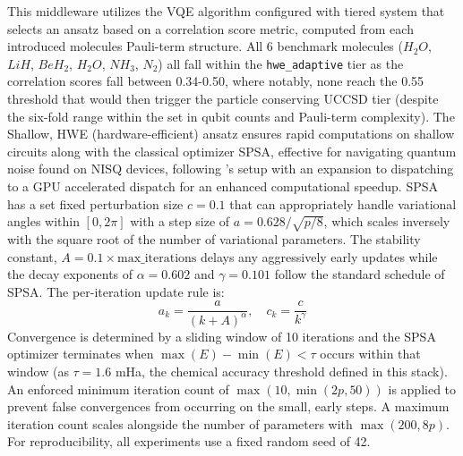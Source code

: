 This middleware utilizes the VQE algorithm configured with tiered system that selects an ansatz based on a correlation score metric, computed
from each introduced molecules Pauli-term structure. All 6 benchmark molecules ($H_{2}O$, $LiH$, $BeH_{2}$, $H_{2}O$, $NH_{3}$, $N_{2}$) all fall within the \texttt{hwe_adaptive}
tier as the correlation scores fall between 0.34-0.50, where notably, none reach the 0.55 threshold that would then trigger the particle conserving UCCSD tier (despite the six-fold range within the set in qubit 
counts and Pauli-term complexity). The Shallow, HWE (hardware-efficient) ansatz ensures rapid computations on shallow circuits along with the classical optimizer SPSA, 
effective for navigating quantum noise found on NISQ devices, following \textcite{kandala2017hardware}'s setup with an expansion to dispatching to a GPU accelerated dispatch for an enhanced computational speedup.  
SPSA has a set fixed perturbation size $c = 0.1$ that can appropriately handle variational 
angles within $[0,2\pi]$ with a step size of $a=0.628 / \sqrt{p/8}$, which scales inversely with the square root of the 
number of variational parameters. The stability constant, $A = 0.1 \times \text{max\_iterations}$ delays any aggressively early 
updates while the decay exponents of $\alpha= 0.602$ and $\gamma = 0.101$ follow the standard schedule of SPSA. The per-iteration update rule is:
\begin{equation}
    a_k = \frac{a}{(k + A)^\alpha}, \quad c_k = \frac{c}{k^\gamma}
\end{equation}
Convergence is determined by a sliding window of 10 iterations and the SPSA optimizer terminates when $\max(E)-\min(E) < \tau$ occurs 
within that window (as $\tau = 1.6$ mHa, the chemical accuracy threshold defined in this stack). An enforced minimum iteration count of $\max(10, \min(2p, 50))$ 
is applied to prevent false convergences from occurring on the small, early steps. A maximum iteration count scales alongside 
the number of parameters with $\max(200, 8p)$. For reproducibility, all experiments use a fixed random seed of 42. 

